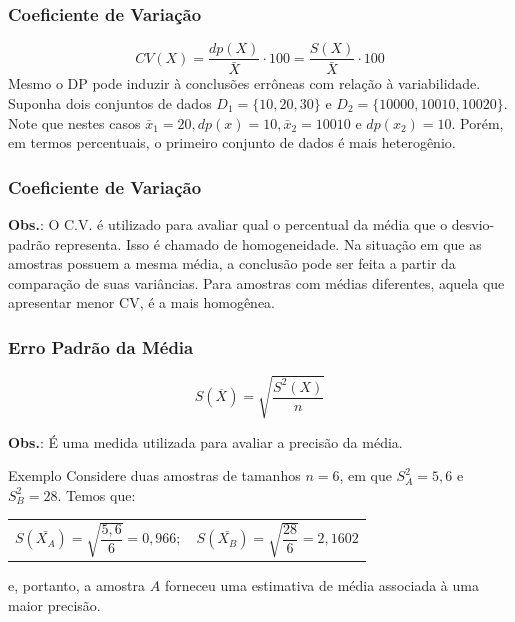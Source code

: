 \documentclass[14pt,aspectratio=1610]{beamer}
\begin{document}
\begin{frame}{}
\frametitle{Coeficiente de Variação}
\begin{block}{}
\justifying
\begin{equation}
CV(X)=\dfrac{dp(X)}{\bar{X}}\cdot 100 = \dfrac{S(X)}{\bar{X}}\cdot 100
\end{equation}
Mesmo o DP pode induzir à conclusões errôneas com relação à variabilidade. Suponha dois conjuntos de dados 
$D_{1}=\{10,20,30\}$ e $D_{2}=\{10000,10010,10020\}.$ Note que nestes casos $\bar{x}_{1}=20, dp(x)=10, 
\bar{x}_{2}=10010$ e $dp(x_{2})=10.$ Porém, em termos percentuais, o primeiro conjunto de dados é mais 
heterogênio.
\end{block}

\end{frame}

\begin{frame}{}
	\frametitle{Coeficiente de Variação}
		\begin{block}{}
		\justifying
		\noindent \textbf{Obs.}: O C.V. é utilizado para avaliar qual o percentual da média que o desvio-padrão representa. Isso é chamado de homogeneidade. Na situação em que as amostras possuem a mesma média, a conclusão pode ser feita a partir da comparação de suas variâncias. Para amostras com médias diferentes, aquela que apresentar menor CV, é a mais homogênea.
	\end{block}
\end{frame}

\begin{frame}{}
    \frametitle{Erro Padrão da Média}
    \small
    \begin{block}{}
    \begin{equation*}
	S(\overline{X}) = \sqrt{ \dfrac{S^2(X)}{n} }
	\end{equation*}
	
	\noindent \textbf{Obs.}: É uma medida utilizada para avaliar a precisão da média. 
    \end{block}
    \pause
    \begin{block}{Exemplo}
    Considere duas amostras de tamanhos $n=6$, em que $S^{2}_{A}
= 5,6$ e $S^{2}_{B}= 28.$ Temos que:

\begin{table}[H]
    \centering
    \begin{tabular}{cc}
    $S(\bar{X_{A}})=\sqrt{\dfrac{5,6}{6}}=0,966;$     &  
    $S(\bar{X_{B}})=\sqrt{\dfrac{28}{6}}=2,1602$
    \end{tabular}
\end{table}
e, portanto, a amostra $A$ forneceu uma estimativa de média associada à uma maior precisão. 
    \end{block}
\end{frame}
\end{document}
